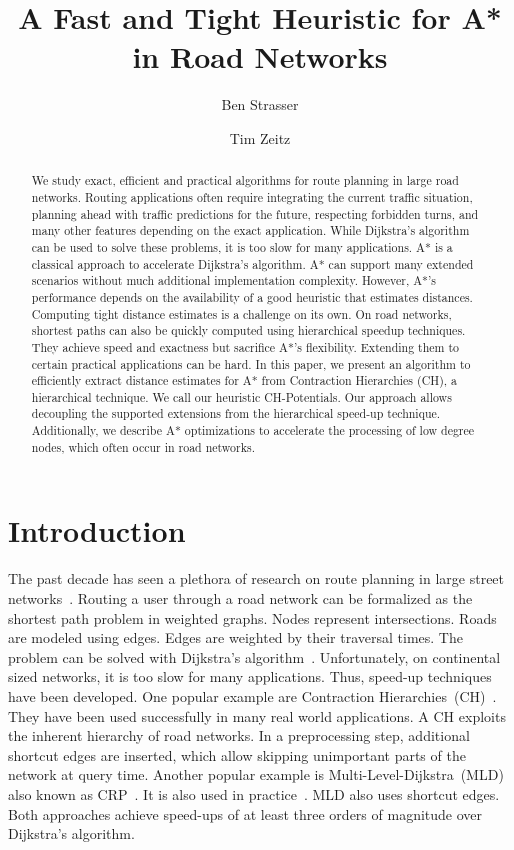 \documentclass[a4paper,UKenglish,cleveref, autoref, thm-restate]{lipics-v2021}
\title{A Fast and Tight Heuristic for A* in Road Networks}
\author{Ben Strasser}{Germany}{academia@ben-strasser.net}{}{}
\author{Tim Zeitz}{Karlsruhe Institute of Technology, Germany}{tim.zeitz@kit.edu}{https://orcid.org/0000-0003-4746-3582}{}
\begin{document}
\maketitle

\begin{abstract}
We study exact, efficient and practical algorithms for route planning in large road networks.
Routing applications often require integrating the current traffic situation, planning ahead with traffic predictions for the future, respecting forbidden turns, and many other features depending on the exact application.
While Dijkstra's algorithm can be used to solve these problems, it is too slow for many applications.
A* is a classical approach to accelerate Dijkstra's algorithm.
A* can support many extended scenarios without much additional implementation complexity.
However, A*'s performance depends on the availability of a good heuristic that estimates distances.
Computing tight distance estimates is a challenge on its own.
On road networks, shortest paths can also be quickly computed using hierarchical speedup techniques.
They achieve speed and exactness but sacrifice A*'s flexibility.
Extending them to certain practical applications can be hard.
In this paper, we present an algorithm to efficiently extract distance estimates for A* from Contraction Hierarchies (CH), a hierarchical technique.
We call our heuristic CH-Potentials.
Our approach allows decoupling the supported extensions from the hierarchical speed-up technique.
Additionally, we describe A* optimizations to accelerate the processing of low degree nodes, which often occur in road networks.
\end{abstract}

\section{Introduction}
\label{sec:intro}
The past decade has seen a plethora of research on route planning in large street networks~\cite{bdgmpsww-rptn-16}.
Routing a user through a road network can be formalized as the shortest path problem in weighted graphs.
Nodes represent intersections.
Roads are modeled using edges.
Edges are weighted by their traversal times.
The problem can be solved with Dijkstra's algorithm~\cite{d-ntpcg-59}.
Unfortunately, on continental sized networks, it is too slow for many applications.
Thus, speed-up techniques have been developed.
One popular example are Contraction Hierarchies~(CH)~\cite{gssv-erlrn-12}.
They have been used successfully in many real world applications.
A CH exploits the inherent hierarchy of road networks.
In a preprocessing step, additional shortcut edges are inserted, which allow skipping unimportant parts of the network at query time.
Another popular example is Multi-Level-Dijkstra~(MLD)~\cite{swz-umlgt-02} also known as CRP~\cite{dgpw-crprn-13}.
It is also used in practice~\cite{bingblog}.
MLD also uses shortcut edges.
Both approaches achieve speed-ups of at least three orders of magnitude over Dijkstra's algorithm.
\end{document}
